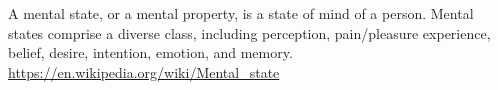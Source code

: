 \documentclass[a4paper]{standalone}
\begin{document}
    A mental state, or a mental property, is a state of mind of a person. Mental states comprise a diverse class, including perception, pain/pleasure experience, belief, desire, intention, emotion, and memory.
    \url{https://en.wikipedia.org/wiki/Mental_state}
\end{document}

